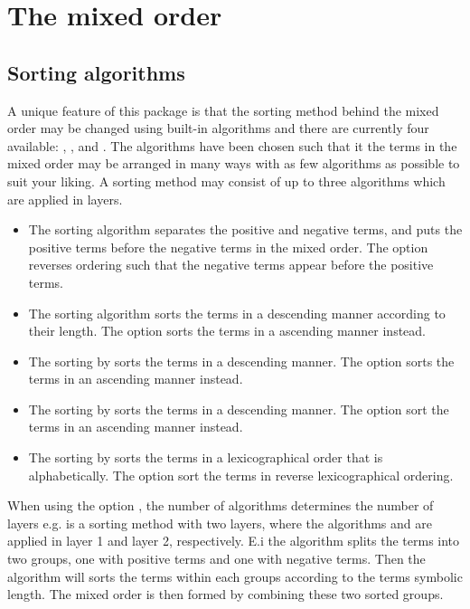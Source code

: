 	
	\clearpage
	\section{The mixed order} \label{ssec:overall_order}

\subsection{Sorting algorithms} \label{ssec:sort-method}
A unique feature of this package is that the sorting method behind the mixed order may be changed using built-in algorithms and there are currently four available: , ,  and . The algorithms have been chosen such that it the terms in the mixed order may be arranged in many ways with as few algorithms as possible to suit your liking. A sorting method may consist of up to three algorithms which are applied in layers.

\begin{itemize}
	\item The sorting algorithm  separates the positive and negative terms, and puts the positive terms before the negative terms in the mixed order. The option  reverses ordering such that the negative terms appear before the positive terms.
	\item The sorting algorithm  sorts the terms in a descending manner according to their length. The option  sorts the terms in a ascending manner instead.
	\item The sorting by  sorts the terms in a descending manner. The option  sorts the terms in an ascending manner instead.
	\item The sorting by  sorts the terms in a descending manner. The option  sort the terms in an ascending manner instead.
	\item The sorting by  sorts the terms in a lexicographical order that is alphabetically. The option  sort the terms in reverse lexicographical ordering.
\end{itemize}

When using the option , the number of algorithms determines the number of layers e.g.  is a sorting method with two layers, where the algorithms  and  are applied in layer \num{1} and layer \num{2}, respectively. E.i the  algorithm splits the terms into two groups, one with positive terms and one with negative terms. Then the  algorithm will sorts the terms within each groups according to the terms symbolic length. The mixed order is then formed by combining these two sorted groups.

